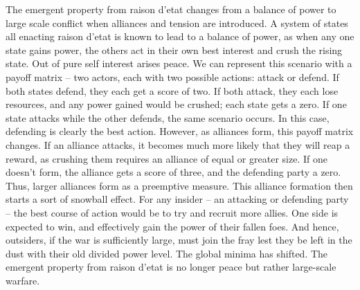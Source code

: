 \documentclass[letterpaper]{article}
\begin{document}
The emergent property from raison d'etat changes from a balance of power
to large scale conflict when alliances and tension are introduced. A
system of states all enacting raison d'etat is known to lead to a
balance of power, as when any one state gains power, the others act in
their own best interest and crush the rising state. Out of pure self
interest arises peace. We can represent this scenario with a payoff
matrix -- two actors, each with two possible actions: attack or defend.
If both states defend, they each get a score of two. If both attack,
they each lose resources, and any power gained would be crushed; each
state gets a zero. If one state attacks while the other defends, the
same scenario occurs. In this case, defending is clearly the best
action. However, as alliances form, this payoff matrix changes. If an
alliance attacks, it becomes much more likely that they will reap a
reward, as crushing them requires an alliance of equal or greater size.
If one doesn't form, the alliance gets a score of three, and the
defending party a zero. Thus, larger alliances form as a preemptive
measure. This alliance formation then starts a sort of snowball effect.
For any insider -- an attacking or defending party -- the best course of
action would be to try and recruit more allies. One side is expected to
win, and effectively gain the power of their fallen foes. And hence,
outsiders, if the war is sufficiently large, must join the fray lest
they be left in the dust with their old divided power level. The global
minima has shifted. The emergent property from raison d'etat is no
longer peace but rather large-scale warfare.
\end{document}
